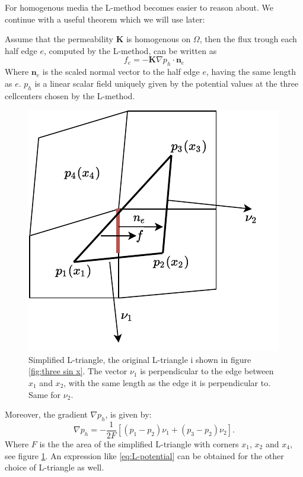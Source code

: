 \documentclass[../Main/main.tex]{subfiles}
\begin{document}
	\par 
	For homogenous media the L-method becomes easier to reason about. We continue with a useful theorem which we will use later:
	
	\begin{lemma} \label{lemma:L_potential}
		Assume that the permeability $\bm{K}$ is homogenous on $\Omega$, then the flux trough each half edge $e$, computed by the L-method, can be written as
		\begin{equation}
			f_e = -\bm{K} \nabla p_h \cdot \bm{n}_e
		\end{equation}
		Where $\bm{n}_e$ is the scaled normal vector to the half edge $e$, having the same length as $e$. $p_h$ is a linear scalar field uniquely given by the potential values at the three cellcenters chosen by the L-method.
		\begin{figure}[H]
			\centering
			\includegraphics{Right choice linear potential.pdf}
			\caption{Simplified L-triangle, the original L-triangle i shown in figure \ref{fig:three sin x}. The vector $\nu_1$ is perpendicular to the edge between $x_1$ and $x_2$, with the same length as the edge it is perpendicular to. Same for $\nu_2$.}
			\label{fig:L-triangle-potential}
		\end{figure}
		Moreover, the gradient $\nabla p_h$, is given by:
		\begin{equation}\label{eq:L-potential}
			\nabla p_h = -\frac{1}{2F}[(p_1 - p_2)\nu_1 + (p_3 - p_2)\nu_2 ].
		\end{equation}
		Where $F$ is the the area of the simplified L-triangle with corners $x_1$, $x_2$ and $x_4$, see figure  \ref{fig:L-triangle-potential}. An expression like \eqref{eq:L-potential} can be obtained for the other choice of L-triangle as well.
	\end{lemma}
\end{document}
